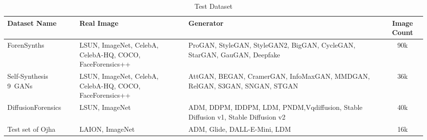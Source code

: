 
\begin{table}[H]
	\centering
	\caption{Test Dataset}
	\label{table_test_dataset}
	\begin{adjustbox}{max width=\textwidth}
		\setlength{\tabcolsep}{12pt} %
		\renewcommand{\arraystretch}{1.1} %
		\begin{tabular}{l m{4cm} m{4cm} c}
			\toprule
			\multirow{1}{*}{Dataset Name} &
			\multirow{1}{*}{Real Image} &
			\multirow{1}{*}{Generator} &
			\multirow{1}{*}{Image Count} \\ \hline
			{ForenSynths~\cite{Wang2019CNNGeneratedIA}} & {LSUN, ImageNet, CelebA, CelebA-HQ, COCO, \newline FaceForensics++} & {ProGAN, StyleGAN, StyleGAN2, BigGAN, CycleGAN, StarGAN, GauGAN, Deepfake} & 90k \\ \hdashline
			{Self-Synthesis 9~GANs~\cite{Tan2023RethinkingTU}} & {LSUN, ImageNet, CelebA, CelebA-HQ, COCO, \newline FaceForensics++} & {AttGAN, BEGAN, CramerGAN, InfoMaxGAN, MMDGAN, RelGAN, S3GAN, SNGAN, STGAN} & 36k \\ \hdashline
			{DiffusionForensics~\cite{Wang2023DIREFD}} & {LSUN, ImageNet} & {ADM, DDPM, IDDPM, LDM, PNDM,Vqdiffusion, Stable Diffusion
				v1, Stable Diffusion v2} & 40k \\ \hdashline
			{Test set of Ojha~\cite{Ojha2023TowardsUF}} & {LAION, ImageNet} & {ADM, Glide, DALL-E-Mini, LDM	} & 16k \\
			
			
			
			\bottomrule

		\end{tabular}
	\end{adjustbox}
\end{table}


